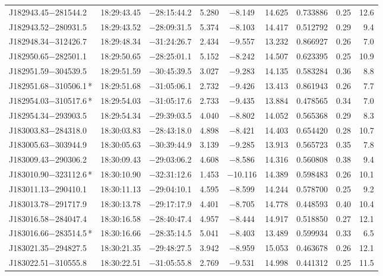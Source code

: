 \begin{table*}
\begin{tabular}{lcccccccr}
J182943.45$-$281544.2 & 18:29:43.45 & $-$28:15:44.2 &  5.280 & $-$8.149 & 14.625 & 0.733886 & 0.25 & 12.6 \\
J182943.52$-$280931.5 & 18:29:43.52 & $-$28:09:31.5 &  5.374 & $-$8.103 & 14.417 & 0.512792 & 0.29 & 9.4 \\
J182948.34$-$312426.7 & 18:29:48.34 & $-$31:24:26.7 &  2.434 & $-$9.557 & 13.232 & 0.866927 & 0.26 & 7.0 \\
J182950.65$-$282501.1 & 18:29:50.65 & $-$28:25:01.1 &  5.152 & $-$8.242 & 14.507 & 0.623395 & 0.25 & 10.9 \\
J182951.59$-$304539.5 & 18:29:51.59 & $-$30:45:39.5 &  3.027 & $-$9.283 & 14.135 & 0.583284 & 0.36 & 8.8 \\
J182951.68$-$310506.1\,* & 18:29:51.68 & $-$31:05:06.1 &  2.732 & $-$9.426 & 13.413 & 0.861943 & 0.26 & 7.7 \\
J182954.03$-$310517.6\,* & 18:29:54.03 & $-$31:05:17.6 &  2.733 & $-$9.435 & 13.884 & 0.478565 & 0.34 & 7.0 \\
J182954.34$-$293903.5 & 18:29:54.34 & $-$29:39:03.5 &  4.040 & $-$8.802 & 14.052 & 0.565368 & 0.29 & 8.3 \\
J183003.83$-$284318.0 & 18:30:03.83 & $-$28:43:18.0 &  4.898 & $-$8.421 & 14.403 & 0.654420 & 0.28 & 10.7 \\
J183005.63$-$303944.9 & 18:30:05.63 & $-$30:39:44.9 &  3.139 & $-$9.285 & 13.913 & 0.565723 & 0.35 & 7.8 \\
J183009.43$-$290306.2 & 18:30:09.43 & $-$29:03:06.2 &  4.608 & $-$8.586 & 14.316 & 0.560808 & 0.38 & 9.4 \\
J183010.90$-$323112.6\,* & 18:30:10.90 & $-$32:31:12.6 &  1.453 & $-$10.116 & 14.389 & 0.598483 & 0.26 & 10.1 \\
J183011.13$-$290410.1 & 18:30:11.13 & $-$29:04:10.1 &  4.595 & $-$8.599 & 14.244 & 0.578700 & 0.25 & 9.2 \\
J183013.78$-$291717.9 & 18:30:13.78 & $-$29:17:17.9 &  4.401 & $-$8.705 & 14.778 & 0.448593 & 0.40 & 10.4 \\
J183016.58$-$284047.4 & 18:30:16.58 & $-$28:40:47.4 &  4.957 & $-$8.444 & 14.917 & 0.518850 & 0.27 & 12.1 \\
J183016.66$-$283514.5\,* & 18:30:16.66 & $-$28:35:14.5 &  5.041 & $-$8.403 & 13.489 & 0.599934 & 0.33 & 6.5 \\
J183021.35$-$294827.5 & 18:30:21.35 & $-$29:48:27.5 &  3.942 & $-$8.959 & 15.053 & 0.463678 & 0.26 & 12.1 \\
J183022.51$-$310555.8 & 18:30:22.51 & $-$31:05:55.8 &  2.769 & $-$9.531 & 14.998 & 0.441312 & 0.25 & 11.5 \\

\end{tabular}
\end{table*}

